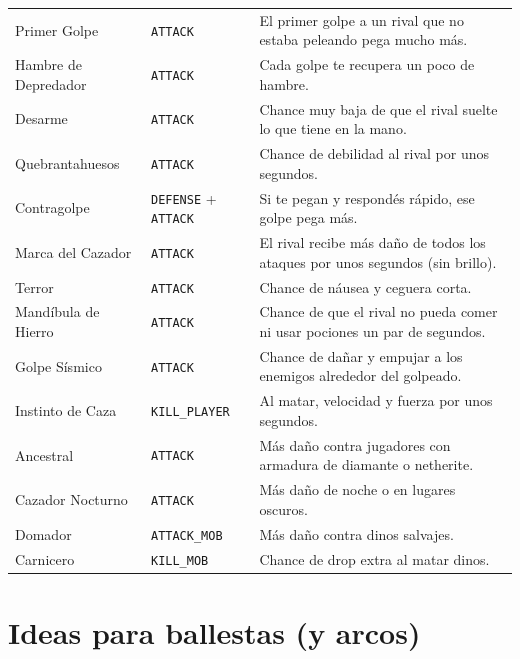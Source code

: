 \documentclass[11pt,a4paper]{article}
\newcommand{\tr}[1]{\texttt{\small #1}}           %
\begin{document}
\begin{longtable}{L{3.5cm} L{3.4cm} L{8.6cm}}
Primer Golpe & \tr{ATTACK} & El primer golpe a un rival que no estaba peleando pega mucho más.\\
Hambre de Depredador & \tr{ATTACK} & Cada golpe te recupera un poco de hambre.\\
Desarme & \tr{ATTACK} & Chance muy baja de que el rival suelte lo que tiene en la mano.\\
Quebrantahuesos & \tr{ATTACK} & Chance de debilidad al rival por unos segundos.\\
Contragolpe & \tr{DEFENSE} + \tr{ATTACK} & Si te pegan y respondés rápido, ese golpe pega más.\\
Marca del Cazador & \tr{ATTACK} & El rival recibe más daño de todos los ataques por unos segundos (sin brillo).\\
Terror & \tr{ATTACK} & Chance de náusea y ceguera corta.\\
Mandíbula de Hierro & \tr{ATTACK} & Chance de que el rival no pueda comer ni usar pociones un par de segundos.\\
Golpe Sísmico & \tr{ATTACK} & Chance de dañar y empujar a los enemigos alrededor del golpeado.\\
Instinto de Caza & \tr{KILL\_PLAYER} & Al matar, velocidad y fuerza por unos segundos.\\
Ancestral & \tr{ATTACK} & Más daño contra jugadores con armadura de diamante o netherite.\\
Cazador Nocturno & \tr{ATTACK} & Más daño de noche o en lugares oscuros.\\
Domador & \tr{ATTACK\_MOB} & Más daño contra dinos salvajes.\\
Carnicero & \tr{KILL\_MOB} & Chance de drop extra al matar dinos.\\
\bottomrule
\end{longtable}

\section{Ideas para ballestas (y arcos)}
\end{document}
